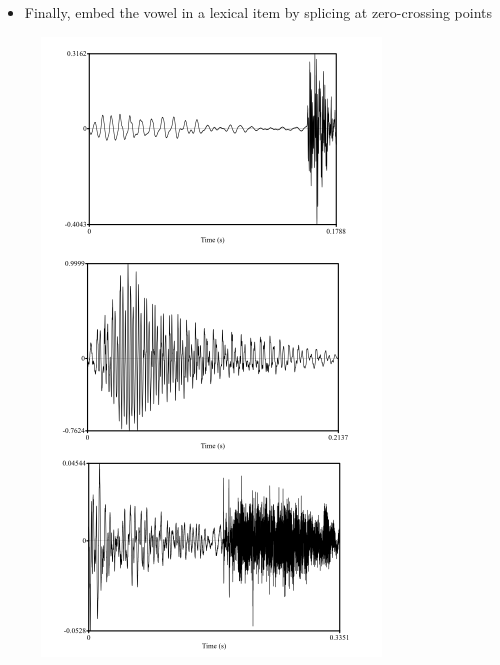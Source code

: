 \documentclass{beamer}
\begin{document}
\begin{frame}
\begin{itemize}
\item{Finally, embed the vowel in a lexical item by splicing at zero-crossing points}
\end{itemize}
\begin{figure}
\includegraphics[scale=0.3,keepaspectratio]{concat.png}
\end{figure}
\end{frame}
\end{document}

